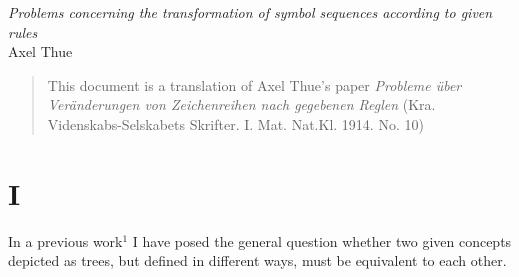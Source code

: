 


\titleformat{\section}[hang]{\normalfont\huge}{\thesection}{1em}{\filcenter\S\;}[]

\titleformat{\subsection}[hang]{\Large\sffamily}{\thesubsection}{1em}{\filcenter}[]


\newcommand\UseKEquationNumbering{
  \renewcommand{\theequation}{K}
}

\newcommand\UseGreekEquationNumbering{
  \renewcommand{\theequation}{\greek{equation}}
  \setcounter{equation}{0}
}

\newtheorem{problem}{Problem}
\renewcommand{\theproblem}{(\Roman{problem})}

\setcounter{page}{493}
\newcommand\mypage[1]{\newpage}






\noindent
{\Large\em Problems concerning the transformation of
symbol sequences according to given rules}\\

\medskip
\noindent
Axel Thue

\medskip
{}\marginnote{\today}


\begin{abstract}
\noindent This document is a translation of Axel Thue's paper 
  \emph{Probleme
  \"uber Ver\"anderungen von Zeichenreihen nach gegebenen Reglen}
(Kra. Videnskabs-Selskabets
Skrifter. I. Mat. Nat.Kl. 1914. No. 10)
\end{abstract}


\section{I}\label{sec:one} 

In a previous work${}^1$ I have posed the general
question whether two given concepts depicted as trees, but defined in
different ways, must be equivalent to each other.

